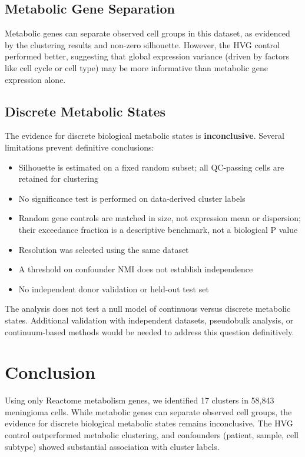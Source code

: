 \documentclass[11pt,a4paper]{article}
\begin{document}
\subsection{Metabolic Gene Separation}
Metabolic genes can separate observed cell groups in this dataset, as evidenced by the clustering results and non-zero silhouette. However, the HVG control performed better, suggesting that global expression variance (driven by factors like cell cycle or cell type) may be more informative than metabolic gene expression alone.

\subsection{Discrete Metabolic States}
The evidence for discrete biological metabolic states is \textbf{inconclusive}. Several limitations prevent definitive conclusions:
\begin{itemize}
    \item Silhouette is estimated on a fixed random subset; all QC-passing cells are retained for clustering
    \item No significance test is performed on data-derived cluster labels
    \item Random gene controls are matched in size, not expression mean or dispersion; their exceedance fraction is a descriptive benchmark, not a biological P value
    \item Resolution was selected using the same dataset
    \item A threshold on confounder NMI does not establish independence
    \item No independent donor validation or held-out test set
\end{itemize}

The analysis does not test a null model of continuous versus discrete metabolic states. Additional validation with independent datasets, pseudobulk analysis, or continuum-based methods would be needed to address this question definitively.

\section{Conclusion}
Using only Reactome metabolism genes, we identified 17 clusters in 58,843 meningioma cells. While metabolic genes can separate observed cell groups, the evidence for discrete biological metabolic states remains inconclusive. The HVG control outperformed metabolic clustering, and confounders (patient, sample, cell subtype) showed substantial association with cluster labels.
\end{document}
